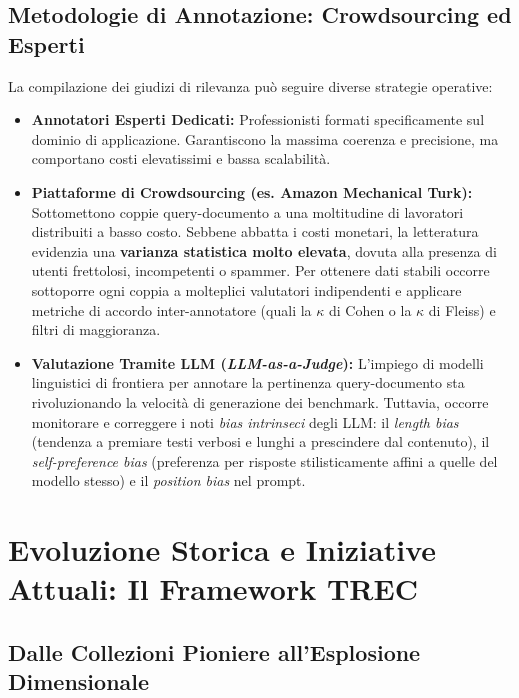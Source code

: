\FloatBarrier
\subsection{Metodologie di Annotazione: Crowdsourcing ed Esperti}
\label{subsec:metodologie-annotazione}

La compilazione dei giudizi di rilevanza può seguire diverse strategie operative:

\begin{itemize}
    \item \textbf{Annotatori Esperti Dedicati:} Professionisti formati specificamente sul dominio di applicazione. Garantiscono la massima coerenza e precisione, ma comportano costi elevatissimi e bassa scalabilit\`a.
    \item \textbf{Piattaforme di Crowdsourcing (es. Amazon Mechanical Turk):} Sottomettono coppie query-documento a una moltitudine di lavoratori distribuiti a basso costo. Sebbene abbatta i costi monetari, la letteratura evidenzia una \textbf{varianza statistica molto elevata}, dovuta alla presenza di utenti frettolosi, incompetenti o spammer. Per ottenere dati stabili occorre sottoporre ogni coppia a molteplici valutatori indipendenti e applicare metriche di accordo inter-annotatore (quali la $\kappa$ di Cohen o la $\kappa$ di Fleiss) e filtri di maggioranza.
    \item \textbf{Valutazione Tramite LLM (\textit{LLM-as-a-Judge}):} L'impiego di modelli linguistici di frontiera per annotare la pertinenza query-documento sta rivoluzionando la velocit\`a di generazione dei benchmark. Tuttavia, occorre monitorare e correggere i noti \textit{bias intrinseci} degli LLM: il \textit{length bias} (tendenza a premiare testi verbosi e lunghi a prescindere dal contenuto), il \textit{self-preference bias} (preferenza per risposte stilisticamente affini a quelle del modello stesso) e il \textit{position bias} nel prompt.
\end{itemize}

\FloatBarrier
\section{Evoluzione Storica e Iniziative Attuali: Il Framework TREC}
\label{sec:storia-trec-benchmark}

\FloatBarrier
\subsection{Dalle Collezioni Pioniere all'Esplosione Dimensionale}
\label{subsec:corpora-storici}

